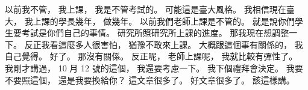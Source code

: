 \hypertarget{w01:cue:651}{}以前我不管，
\hypertarget{w01:cue:652}{}我上課，
\hypertarget{w01:cue:653}{}我是不管考試的。
\hypertarget{w01:cue:654}{}可能這是臺大風格。
\hypertarget{w01:cue:655}{}我相信現在臺大，
\hypertarget{w01:cue:656}{}我上課的學長幾年，
\hypertarget{w01:cue:657}{}做幾年。
\hypertarget{w01:cue:658}{}以前我們老師上課是不管的。
\hypertarget{w01:cue:659}{}就是說你們學生要考試是你們自己的事情。
\hypertarget{w01:cue:660}{}研究所照研究所上課的進度。
\hypertarget{w01:cue:661}{}那我現在想調整一下。
\hypertarget{w01:cue:662}{}反正我看這麼多人很害怕，
\hypertarget{w01:cue:663}{}猶豫不敢來上課。
\hypertarget{w01:cue:664}{}大概跟這個事有關係的，
\hypertarget{w01:cue:665}{}我自己覺得。
\hypertarget{w01:cue:666}{}好了。
\hypertarget{w01:cue:667}{}那沒有關係。
\hypertarget{w01:cue:668}{}反正呢，
\hypertarget{w01:cue:669}{}老師上課呢，
\hypertarget{w01:cue:670}{}我就比較有彈性了。
\hypertarget{w01:cue:671}{}我剛才講過，
\hypertarget{w01:cue:672}{}10 月 12 號的這個，
\hypertarget{w01:cue:673}{}我還要考慮一下。
\hypertarget{w01:cue:674}{}我下個禮拜會決定。
\hypertarget{w01:cue:675}{}我要不要照這個，
\hypertarget{w01:cue:676}{}還是我要換給你？
\hypertarget{w01:cue:677}{}這文章很多了。
\hypertarget{w01:cue:678}{}好文章很多了。
\hypertarget{w01:cue:679}{}該這樣講。


